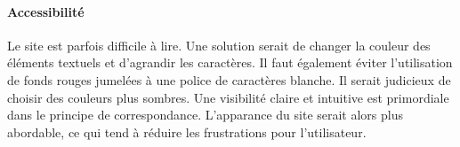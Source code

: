 \documentclass[9pt]{report}
\begin{document}
\begin{multicols*}{2}
\paragraph{Accessibilité}
Le site est parfois difficile à lire. Une solution serait de changer la couleur des éléments textuels et d'agrandir les caractères. Il faut 
également éviter l'utilisation de fonds rouges jumelées à une police de 
caractères blanche. Il serait judicieux de choisir des couleurs plus sombres. Une visibilité claire et intuitive est primordiale dans le principe de correspondance. L'apparance du site serait alors plus abordable, ce qui tend 
à réduire les frustrations pour l’utilisateur.
\end{multicols*}
\end{document}
